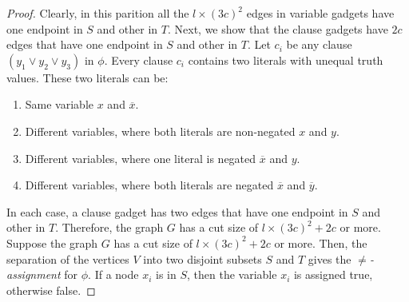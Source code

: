 \documentclass[11pt]{article}
\begin{document}
\begin{proof}
Clearly, in this parition all the $l \times (3c)^2$ edges in variable gadgets have one endpoint in $S$ and other in $T$. Next, we show that the clause gadgets have $2c$ edges that have one endpoint in $S$ and other in $T$. Let $c_i$ be any clause $(y_1 \vee y_2 \vee y_3)$ in $\phi$. Every clause $c_i$ contains two literals with unequal truth values. These two literals can be:
\begin{enumerate}
\item Same variable $x$ and $\overline{x}$.
\item Different variables, where both literals are non-negated $x$ and $y$.
\item Different variables, where one literal is negated $\overline{x}$ and $y$.
\item Different variables, where both literals are negated $\overline{x}$ and $\overline{y}$.
\end{enumerate}

In each case, a clause gadget has two edges that have one endpoint in $S$ and other in $T$. Therefore, the graph $G$ has a cut size of $l \times (3c)^2 + 2c$ or more. \\

Suppose the graph $G$ has a cut size of $l \times (3c)^2 + 2c$ or more. Then, the separation of the vertices $V$ into two disjoint subsets $S$ and $T$ gives the $\neq$\textit{-assignment} for $\phi$. If a node $x_i$ is in $S$, then the variable $x_i$ is assigned true, otherwise false.

\end{proof}
\end{document}
